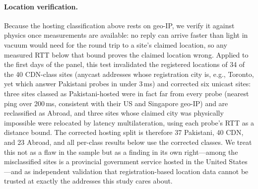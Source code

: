 

\paragraph{Location verification.}
Because the hosting classification above rests on geo-IP, we verify it against physics once
measurements are available: no reply can arrive faster than light in vacuum would need for the
round trip to a site's claimed location, so any measured RTT below that bound proves the claimed
location wrong. Applied to the first days of the panel, this test invalidated the registered
locations of 34 of the 40 CDN-class sites (anycast addresses whose registration city is, e.g.,
Toronto, yet which answer Pakistani probes in under 3\,ms) and corrected six unicast sites: three
sites classed as Pakistani-hosted were in fact far from every probe (nearest ping over 200\,ms,
consistent with their US and Singapore geo-IP) and are reclassified as Abroad, and three sites
whose claimed city was physically impossible were relocated by latency multilateration, using each
probe's RTT as a distance bound. The corrected hosting split is therefore 37 Pakistani, 40 CDN,
and 23 Abroad, and all per-class results below use the corrected classes. We treat this not as a
flaw in the sample but as a finding in its own right---among the misclassified sites is a
provincial government service hosted in the United States---and as independent validation that
registration-based location data cannot be trusted at exactly the addresses this study cares
about.




